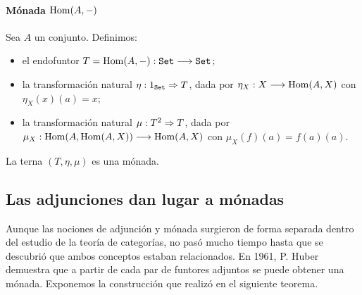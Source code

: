 \paragraph{Mónada $\operatorname{Hom}(A, -)$}
Sea $A$ un conjunto. Definimos:

\begin{itemize}
\item el endofuntor $T = \operatorname{Hom}(A, -) : \texttt{Set}\longrightarrow \texttt{Set}$;
\item la transformación natural $\eta : 1_{\texttt{Set}}\Rightarrow T$, dada
  por $\eta_X : X\longrightarrow \operatorname{Hom}(A, X)$ con $\eta_X(x)(a) = x$;
\item la transformación natural $\mu: T^2\Rightarrow T$, dada por
  $\mu_X : \operatorname{Hom}(A, \operatorname{Hom}(A, X))\longrightarrow \operatorname{Hom}(A, X)$ con
  $\mu_X(f)(a) = f(a)(a)$.
\end{itemize}
La terna $(T, \eta, \mu)$ es una mónada.

\subsection{Las adjunciones dan lugar a mónadas}
Aunque las nociones de adjunción y mónada surgieron de forma separada
dentro del estudio de la teoría de categorías, no pasó mucho tiempo
hasta que se descubrió que ambos conceptos estaban relacionados.
En 1961, P. Huber demuestra que a partir de cada par de funtores adjuntos
se puede obtener una mónada. Exponemos la construcción
que realizó en el siguiente
teorema.


